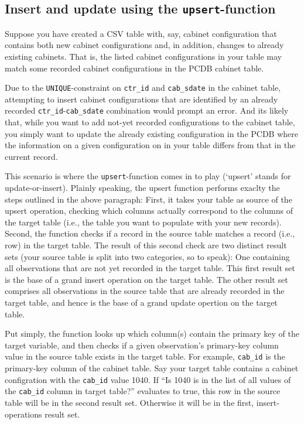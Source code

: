 \subsection{Insert and update using the \texttt{upsert}-function}\label{subsec_upsert_data_function}

Suppose you have created a CSV table with, say, cabinet configuration that contains both new cabinet configurations and, in addition, changes to already existing cabinets. That is, the listed cabinet configurations in your table may match some recorded cabinet configurations in the PCDB cabinet table. 

Due to the \texttt{UNIQUE}-constraint on \texttt{ctr\_id} and \texttt{cab\_sdate} in the cabinet table, attempting to insert cabinet configurations that are identified by an already recorded \texttt{ctr\_id}-\texttt{cab\_sdate} combination would prompt an error. 
And its likely that, while you want to add not-yet recorded configurations to the cabinet table, you simply want to update the already existing configuration in the PCDB where the information on a given configuration on in your table differs from that in the current record.

This scenario is where the \texttt{upsert}-function comes in to play (`upsert' stands for update-or-insert).
Plainly speaking, the upsert function performs exaclty the steps outlined in the above paragraph: 
First, it takes your table as source of the upsert operation, checking which columns actually correspond to the columns of the target table (i.e., the table you want to populate with your new records). 
Second, the function checks if a record in the source table matches a record (i.e., row) in the target table.
The result of this second check are two distinct result sets (your source table is split into two categories, so to speak): One containing all observations that are not yet recorded in the target table. This first result set is the base of a grand insert operation on the target table.
The other result set comprises all observations in the source table that are already recorded in the target table, and hence is the base of a grand update opertion on the target table. 

Put simply, the function looks up which column(s) contain the primary key of the target variable, and then checks if a given observation's primary-key column value in the source table exists in the target table. 
For example, \texttt{cab\_id} is the primary-key column of the cabinet table. Say your target table contains a cabinet configration with the \texttt{cab\_id} value 1040.
If ``Is 1040 is in the list of all values of the \texttt{cab\_id} column in target table?'' evaluates to true, this row in the source table will be in the second result set. Otherwise it will be in the first, insert-operations result set.





